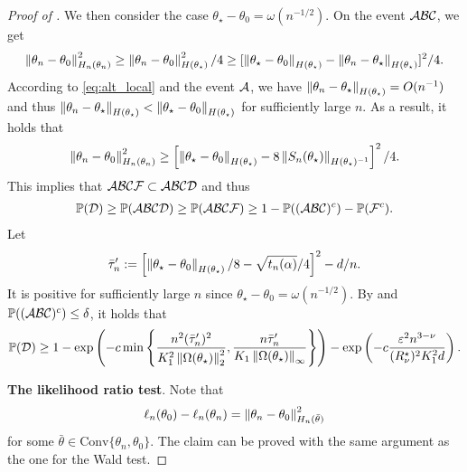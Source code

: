 \begin{proof}[Proof of ]
    We then consider the case $\theta_\star - \theta_0 = \omega(n^{-1/2})$.
    On the event $\mathcal{A} \mathcal{B} \mathcal{C}$, we get
    \begin{align*}
        \left\lVert \theta_n - \theta_0 \right\rVert_{H_n(\theta_n)}^2
        \ge \left\lVert \theta_n - \theta_0 \right\rVert_{H(\theta_\star)}^2 / 4
        \ge [\left\lVert \theta_\star - \theta_0 \right\rVert_{H(\theta_\star)} - \left\lVert \theta_n - \theta_\star \right\rVert_{H(\theta_\star)}]^2 / 4.
    \end{align*}
    According to \eqref{eq:alt_local} and the event $\mathcal{A}$, we have $\left\lVert \theta_n - \theta_\star \right\rVert_{H(\theta_\star)} = O(n^{-1})$ and thus $\left\lVert \theta_n - \theta_\star \right\rVert_{H(\theta_\star)} < \left\lVert \theta_\star - \theta_0 \right\rVert_{H(\theta_\star)}$ for sufficiently large $n$.
    As a result, it holds that
    \begin{align*}
        \left\lVert \theta_n - \theta_0 \right\rVert_{H_n(\theta_n)}^2
        \ge \left[ \left\lVert \theta_\star - \theta_0 \right\rVert_{H(\theta_\star)} - 8 \left\lVert S_n(\theta_\star) \right\rVert_{H(\theta_\star)^{-1}} \right]^2/4.
    \end{align*}
    This implies that $\mathcal{A} \mathcal{B} \mathcal{C} \mathcal{F} \subset \mathcal{A} \mathcal{B} \mathcal{C} \mathcal{D}$ and thus
    \begin{align*}
        \operatorname{\mathbb P}(\mathcal{D}) \ge \operatorname{\mathbb P}(\mathcal{A} \mathcal{B} \mathcal{C} \mathcal{D}) \ge \operatorname{\mathbb P}(\mathcal{A} \mathcal{B} \mathcal{C} \mathcal{F}) \ge 1 - \operatorname{\mathbb P}((\mathcal{A} \mathcal{B} \mathcal{C})^c) - \operatorname{\mathbb P}(\mathcal{F}^c).
    \end{align*}
    Let
    \begin{align*}
        \bar \tau_n' := \left[ \left\lVert \theta_\star - \theta_0 \right\rVert_{H(\theta_\star)}/8 - \sqrt{t_n(\alpha)}/4 \right]^2 - d/n.
    \end{align*}
    It is positive for sufficiently large $n$ since $\theta_\star - \theta_0 = \omega(n^{-1/2})$.
    By  and $\operatorname{\mathbb P}((\mathcal{A} \mathcal{B} \mathcal{C})^c) \le \delta$, it holds that
    \begin{align*}
        \operatorname{\mathbb P}(\mathcal{D}) \ge 1 - \exp\left( -c\min\left\{ \frac{n^2 (\bar \tau_n')^2}{K_1^2 \left\lVert \Omega(\theta_\star) \right\rVert_2^2}, \frac{n\bar \tau_n'}{K_1 \left\lVert \Omega(\theta_\star) \right\rVert_\infty} \right\} \right) - \exp\left(-c \frac{\varepsilon^2 n^{3-\nu}}{(R_\nu^\star)^2 K_1^2 d} \right).
    \end{align*}
    
    \textbf{The likelihood ratio test}.
    Note that
    \begin{align*}
        \ell_n(\theta_0) - \ell_n(\theta_n) = \left\lVert \theta_n - \theta_0 \right\rVert_{H_n(\bar \theta)}^2
    \end{align*}
    for some $\bar \theta \in \mbox{Conv}\{\theta_n, \theta_0\}$.
    The claim can be proved with the same argument as the one for the Wald test.
\end{proof}

